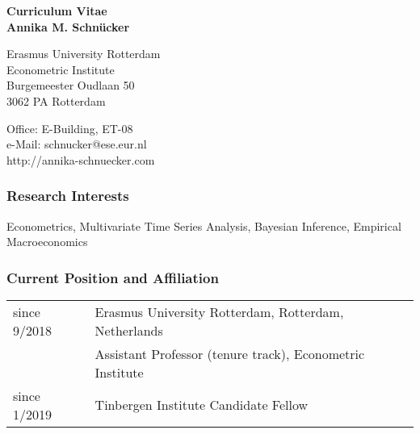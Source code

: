 \documentclass[10pt,a4paper]{article}
\begin{document}
	
	\begin{center}
	{\Large \textbf{Curriculum Vitae}} \vspace{0.2cm} \\ {\large \textbf{Annika M. Schn\"ucker}}
	\end{center}

\begin{multicols}{2}

	\begin{flushleft}
	Erasmus University Rotterdam \\
	Econometric Institute \\
	Burgemeester Oudlaan 50\\
	3062 PA Rotterdam
	
	\end{flushleft}
\begin{flushright}
	Office: E-Building, ET-08\\
	e-Mail: schnucker@ese.eur.nl\\ 
	http://annika-schnuecker.com
\end{flushright}
\end{multicols} 	
\vspace{0.2cm}	
\subsubsection*{Research Interests}
Econometrics, Multivariate Time Series Analysis, Bayesian Inference, Empirical Macroeconomics
\vspace{0.2cm}
\subsubsection*{Current Position and Affiliation}
\begin{tabular}{ p{3cm} | p{13cm}}
since 9/2018 & 	Erasmus University Rotterdam, Rotterdam, Netherlands\\
      & Assistant Professor (tenure track), Econometric Institute \\ [0.1cm]
      
since 1/2019 &      Tinbergen Institute Candidate Fellow
\end{tabular}
\vspace{0.2cm}
\end{document}

